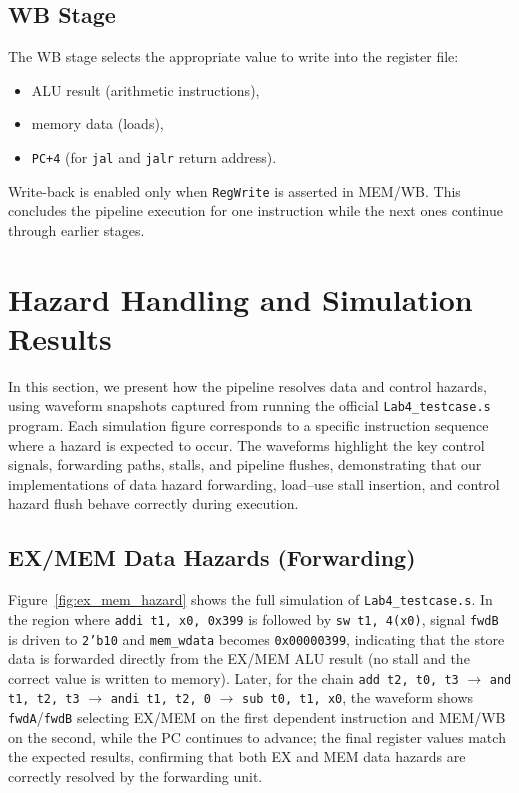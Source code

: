 \documentclass{article}
\begin{document}
\subsection{WB Stage}

The WB stage selects the appropriate value to write into the register file:
\begin{itemize}
    \item ALU result (arithmetic instructions),
    \item memory data (loads),
    \item \texttt{PC+4} (for \texttt{jal} and \texttt{jalr} return address).
\end{itemize}
Write-back is enabled only when \texttt{RegWrite} is asserted in MEM/WB. This concludes the pipeline execution for one instruction while the next ones continue through earlier stages.


\section{Hazard Handling and Simulation Results}

In this section, we present how the pipeline resolves data and control hazards, using waveform snapshots captured from running the official \texttt{Lab4\_testcase.s} program. Each simulation figure corresponds to a specific instruction sequence where a hazard is expected to occur. The waveforms highlight the key control signals, forwarding paths, stalls, and pipeline flushes, demonstrating that our implementations of data hazard forwarding, load–use stall insertion, and control hazard flush behave correctly during execution.

\subsection{EX/MEM Data Hazards (Forwarding)}

Figure~\ref{fig:ex_mem_hazard} shows the full simulation of \texttt{Lab4\_testcase.s}.
In the region where \texttt{addi t1, x0, 0x399} is followed by \texttt{sw t1, 4(x0)},
signal \texttt{fwdB} is driven to \texttt{2'b10} and \texttt{mem\_wdata} becomes
\texttt{0x00000399}, indicating that the store data is forwarded directly from
the EX/MEM ALU result (no stall and the correct value is written to memory).
Later, for the chain \texttt{add t2, t0, t3} $\rightarrow$ \texttt{and t1, t2, t3}
$\rightarrow$ \texttt{andi t1, t2, 0} $\rightarrow$ \texttt{sub t0, t1, x0}, the
waveform shows \texttt{fwdA}/\texttt{fwdB} selecting EX/MEM on the first dependent
instruction and MEM/WB on the second, while the PC continues to advance;
the final register values match the expected results, confirming that both
EX and MEM data hazards are correctly resolved by the forwarding unit.
\end{document}
